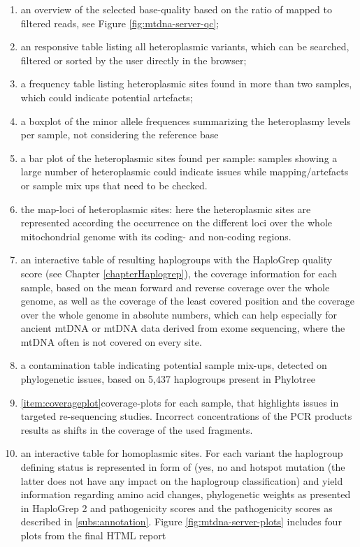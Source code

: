 \begin{enumerate}[label=\textbf{QC.\arabic*}]
\item an overview of the selected base-quality based on the ratio of mapped to filtered reads, see Figure \ref{fig:mtdna-server-qc}; 
\item an responsive table listing all heteroplasmic variants, which can be searched, filtered or sorted by the user directly in the browser; 
\item a frequency table listing heteroplasmic sites found in more than two samples, which could indicate potential artefacts; 
\item \label{item:boxplot} a boxplot of the minor allele frequences summarizing the heteroplasmy levels per sample, not considering the reference base
\item \label{item:barplot}a bar plot of the heteroplasmic sites found per sample: samples showing a large number of heteroplasmic could indicate issues while mapping/artefacts or sample mix ups that need to be checked.  
\item \label{item:maplocus}the map-loci of heteroplasmic sites: here the heteroplasmic sites are represented according the occurrence on the different loci over the whole mitochondrial genome with its coding- and non-coding regions.
\item an interactive table of resulting haplogroups with the HaploGrep quality score (see Chapter \ref{chapterHaplogrep}), the coverage information for each sample, based on the mean forward and reverse coverage over the whole genome, as well as the coverage of the least covered position and the coverage over the whole genome in absolute numbers, which can help especially for ancient mtDNA or mtDNA data derived from exome sequencing, where the mtDNA often is not covered on every site. 
\item  a contamination table indicating potential sample mix-ups, detected on phylogenetic issues, based on 5,437 haplogroups present in Phylotree 
\item  \ref{item:coverageplot}coverage-plots for each sample, that highlights issues in targeted re-sequencing studies. Incorrect concentrations of the PCR products results as shifts in the coverage of the used fragments. 
\item  an interactive table for homoplasmic sites. For each variant the haplogroup defining status is represented in form of (yes, no and hotspot mutation (the latter does not have any impact on the haplogroup classification) and yield information regarding amino acid changes, phylogenetic weights as presented in HaploGrep 2 and pathogenicity scores and the pathogenicity scores as described in \ref{subs:annotation}. Figure \ref{fig:mtdna-server-plots} includes four plots from the final HTML report \cite{Weissensteiner2016b}
\end{enumerate}

